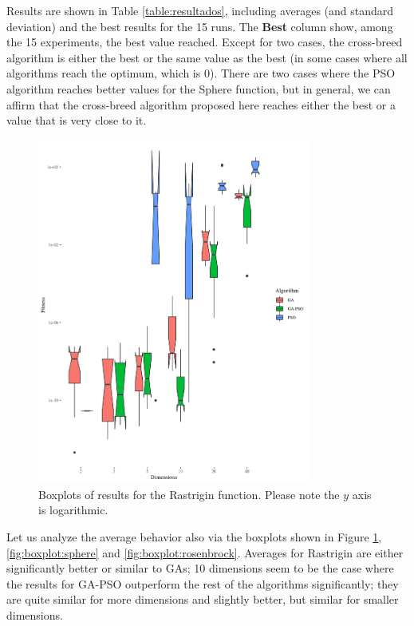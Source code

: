 \documentclass[runningheads]{llncs}
\begin{document}
Results are shown in Table \ref{table:resultados}, including averages
(and standard deviation) and the best results for the 15 runs. The {\bf
  Best} column show, among the 15 experiments, the best value
reached. Except for two cases, the cross-breed algorithm is either the
best or the same value as the best (in some cases where all algorithms
reach the optimum, which is 0). There are two cases where the PSO
algorithm reaches better values for the Sphere function, but in
general, we can affirm that the cross-breed algorithm proposed here
reaches either the best or a value that is very close to it.
%
\begin{figure}[h!tb]
  \centering
  \includegraphics[width=0.8\textwidth]{img/rastrigin-boxplot.png}
  \caption{Boxplots of results for the Rastrigin function. Please note the $y$ axis is logarithmic.\label{fig:boxplot:rastrigin}}
\end{figure}

Let us analyze the average behavior also via the boxplots shown
in Figure \ref{fig:boxplot:rastrigin},  \ref{fig:boxplot:sphere} and
\ref{fig:boxplot:rosenbrock}. Averages for Rastrigin are either
significantly better or similar to GAs; 10 dimensions seem to be the
case where the results for GA-PSO outperform the rest of
the algorithms significantly; they are quite similar for more dimensions and
slightly better, but similar for smaller dimensions. 
\end{document}
